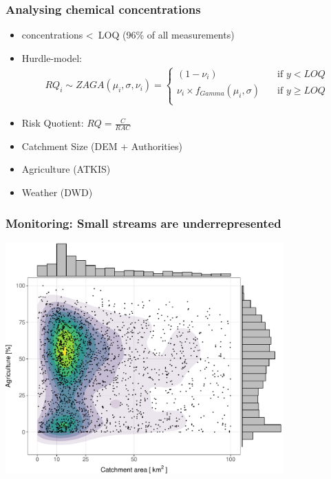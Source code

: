 \documentclass[
	10pt
	]{beamer}
\begin{document}
\begin{frame}
\frametitle{Analysing chemical concentrations}
	\begin{itemize}
		\pause
		\item concentrations \textless~LOQ (96\% of all measurements)
		\pause
		\item Hurdle-model: 
			\begin{align}
			RQ_i \sim ZAGA(\mu_i, \sigma, \nu_i) = 
			  \begin{cases}
			    (1 - \nu_i)   & \quad  \text{if } y < LOQ \\
			    \nu_i \times f_{Gamma} (\mu_i, \sigma) & \quad \text{if } y \ge LOQ \\
			  \end{cases}
			\end{align}
		\pause
		\item Risk Quotient: $RQ = \frac{C}{RAC}$
		\pause
		\item Catchment Size (DEM + Authorities)
		\item Agriculture (ATKIS)
		\item Weather (DWD)
	\end{itemize}
\end{frame}



\begin{frame}
\frametitle{Monitoring: Small streams are underrepresented}
	\includegraphics[width = 0.8\textwidth]{figs/distribution.pdf}
\end{frame}
\end{document}
